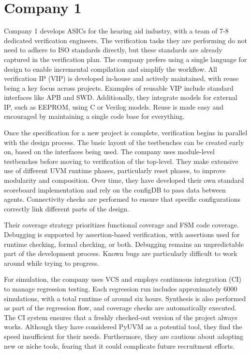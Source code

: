 \documentclass[12pt]{report}
\begin{document}
\section{Company 1} %

Company 1 develops ASICs for the hearing aid industry, with a team of 7-8 dedicated verification engineers. The
verification tasks they are performing do not need to adhere to ISO standards directly, but these standards are
already captured in the verification plan. The company prefers using a single language for design to enable
incremental compilation and simplify the workflow. All verification IP (VIP) is developed in-house and actively
maintained, with reuse being a key focus across projects. Examples of reusable VIP include standard interfaces like
APB and SWD. Additionally, they integrate models for external IP, such as EEPROM, using C or Verilog models. Reuse is
made easy and encouraged by maintaining a single code base for everything.

Once the specification for a new project is complete, verification begins in parallel with the design process. The
basic layout of the testbenches can be created early on, based on the interfaces being used. The company uses
module-level testbenches before moving to verification of the top-level. They make extensive use of different UVM
runtime phases, particularly reset phases, to improve modularity and composition. Over time, they have developed
their own standard scoreboard implementation and rely on the configDB to pass data between agents. Connectivity
checks are performed to ensure that specific configurations correctly link different parts of the design.

Their coverage strategy prioritizes functional coverage and FSM code coverage. Debugging is supported by
assertion-based verification, with assertions used for runtime checking, formal checking, or both. Debugging remains
an unpredictable part of the development process. Known bugs are particularly difficult to work around while trying to progress.

For simulation, the company uses VCS and employs continuous integration (CI) to manage regression testing. Each
regression run includes approximately 6000 simulations, with a total runtime of around six hours. Synthesis is also
performed as part of the regression flow, and coverage checks are automatically executed. The CI system ensures that
a freshly checked-out version of the project always works. Although they have considered PyUVM as a potential tool,
they find the speed insufficient for their needs. Furthermore, they are cautious about adopting new or niche tools,
fearing that it could complicate future recruitment efforts.
\end{document}
